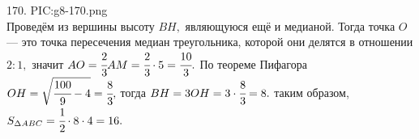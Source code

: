 170. {{PIC:g8-170.png}}\\
Проведём из вершины высоту $BH,$ являющуюся ещё и медианой. Тогда точка $O$ --- это точка пересечения медиан треугольника, которой они делятся в отношении $2:1,$ значит $AO=\cfrac{2}{3}AM=\cfrac{2}{3}\cdot5=\cfrac{10}{3}.$ По теореме Пифагора $OH=\sqrt{\cfrac{100}{9}-4}=\cfrac{8}{3},$ тогда $BH=3OH=3\cdot\cfrac{8}{3}=8.$ таким образом, $S_{\Delta ABC}=\cfrac{1}{2}\cdot8\cdot4=16.$\newpage\noindent
